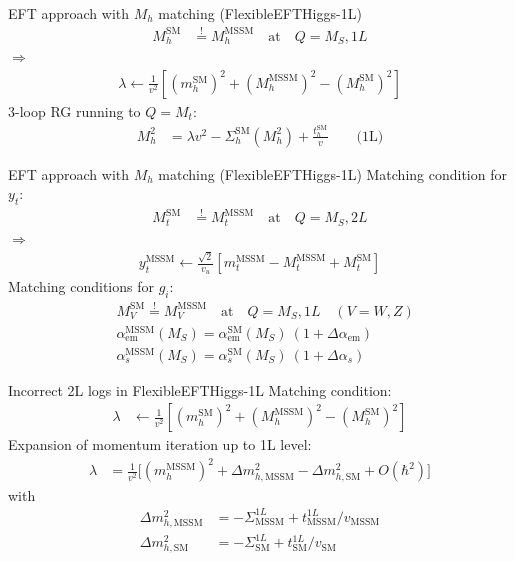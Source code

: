 \documentclass[hyperref={pdfpagelabels=false},ngerman]{beamer}
\newcommand{\SM}{\ensuremath{\text{SM}}}
\newcommand{\MSSM}{\ensuremath{\text{MSSM}}}
\begin{document}
\begin{frame}{EFT approach with $M_h$ matching (FlexibleEFTHiggs-1L)}
  \begin{align*}
    M_h^{\SM} &\overset{!}{=} M_h^\text{MSSM} \quad \text{at} \quad Q = M_S, 1L
  \end{align*}
  $\Rightarrow$
  \begin{align*}
    \lambda \leftarrow \frac{1}{v^2} \left[
      (m_h^\SM)^2 + (M_h^\text{MSSM})^2 - (M_h^\SM)^2
    \right]
  \end{align*}
  3-loop RG running to $Q = M_t$:
  \begin{align*}
    M_h^2 &= \lambda v^2 - \Sigma^{\SM}_h(M_h^2) + \frac{t_h^\SM}{v}
    \qquad \text{(1L)}
  \end{align*}
\end{frame}

\begin{frame}{EFT approach with $M_h$ matching (FlexibleEFTHiggs-1L)}
  Matching condition for $y_t$:
  \begin{align*}
    M_t^{\SM} &\overset{!}{=} M_t^\text{MSSM} \quad \text{at} \quad Q = M_S, 2L
  \end{align*}
  $\Rightarrow$
  \begin{align*}
    y_t^\MSSM \leftarrow \frac{\sqrt{2}}{v_u} \left[
      m_t^\MSSM - M_t^\MSSM + M_t^\SM
    \right]
  \end{align*}
  Matching conditions for $g_i$:
  \begin{align*}
    &M_V^{\SM} \overset{!}{=} M_V^\text{MSSM} \quad \text{at} \quad Q = M_S, 1L \quad (V = W,Z)\\
    &\alpha_{\text{em}}^\MSSM(M_S) = \alpha_{\text{em}}^\SM(M_S) \ (1 + \Delta\alpha_{\text{em}})\\
    &\alpha_s^\MSSM(M_S) = \alpha_s^\SM(M_S) \ (1 + \Delta\alpha_s)
  \end{align*}
\end{frame}


\begin{frame}{Incorrect 2L logs in FlexibleEFTHiggs-1L}
  Matching condition:
  \begin{align*}
    \lambda &\leftarrow \frac{1}{v^2} \left[
      (m_h^\SM)^2 + (M_h^\text{MSSM})^2 - (M_h^\SM)^2
    \right]
  \end{align*}
  Expansion of momentum iteration up to 1L level:
  \begin{align*}
    \lambda &= \frac{1}{v^2} \Big[
      (m_h^\MSSM)^2
      + \Delta m_{h,\MSSM}^2
      - \Delta m_{h,\SM}^2
      + O(\hbar^2)
    \Big]
  \end{align*}
  with
  \begin{align*}
    \Delta m_{h,\MSSM}^2 &= -\Sigma^{1L}_{\MSSM} + t_{\MSSM}^{1L}/v_\MSSM \\
    \Delta m_{h,\SM}^2 &= -\Sigma^{1L}_{\SM} + t^{1L}_{\SM}/v_\SM
  \end{align*}
\end{frame}
\end{document}
